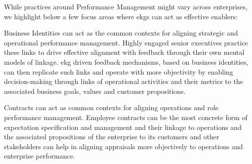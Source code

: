 %
%
While practices around Performance Management might vary across enterprises,
we highlight below a few focus areas where \glspl{ekg} can act as effective enablers:

Business Identities can act as the common contexts for aligning strategic and operational performance management.
Highly engaged senior executives practice these links to drive effective alignment with feedback through their
own mental models of linkage.
\Gls{ekg} driven feedback mechanisms, based on business identities,
can then replicate such links and operate with
more objectivity by enabling decision-making through links of operational activities and their metrics to the
associated business goals, values and customer propositions.

Contracts can act as common contexts for aligning operations and role performance management.
Employee contracts can be the most concrete form of expectation specification and management and their
linkage to operations and the associated propositions of the enterprise to its customers and other
stakeholders can help in aligning appraisals more objectively to operations and enterprise performance.

